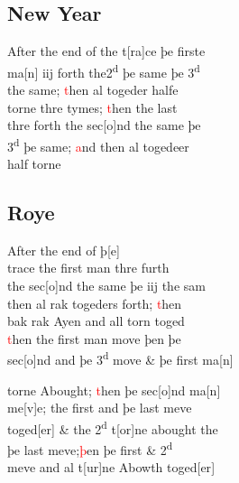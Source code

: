 \documentclass[12pt,letter]{article} %
\newcommand{\red}[1]{\textcolor{red}{#1}}
\newcommand{\srcpg}[1]{
    \noindent{
        \color{Gray}{\rule[0.5ex]{\linewidth}{1pt}~#1} 
    
    }
}
\begin{document}
\subsection{New Year}
After the end of the t{[}ra{]}ce þe firste\\
ma{[}n{]} iij forth the2\textsuperscript{d} þe same þe 3\textsuperscript{d}\\
the same; \red{t}hen al togeder halfe\\
 torne thre tymes; \red{t}hen the last\\
thre forth the sec{[}o{]}nd the same þe\\
3\textsuperscript{d} þe same; \red{a}nd then al togedeer\\
half torne

\subsection{Roye}
After the end of þ{[}e{]}\\
trace the first man thre furth\\
the sec{[}o{]}nd the same þe iij the sam\\
then al rak togeders forth; \red{t}hen\\
bak rak Ayen and all torn toged\\
\red{t}hen the first man move þen þe\\
sec{[}o{]}nd and þe 3\textsuperscript{d} move \& þe first ma{[}n{]} 
\srcpg{66}
 torne Abought; \red{t}hen þe sec{[}o{]}nd ma{[}n{]}\\
me{[}v{]}e; the first and þe last meve\\
toged{[}er{]} \& the 2\textsuperscript{d} t{[}or{]}ne abought the\\
þe last meve;\red{þ}en þe first \& 2\textsuperscript{d}\\
meve and al t{[}ur{]}ne Abowth toged{[}er{]}
\end{document}
